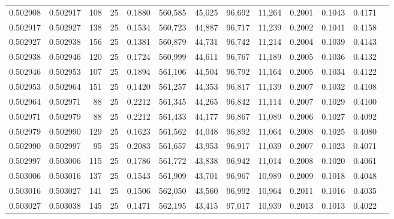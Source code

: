 \begin{tabular}{rrrrrrrrrrrrr}
0.502908 & 0.502917 & 108 &  25 &                                     0.1880 & 560,585 &  45,025 &  96,692 &  11,264 & 0.2001 & 0.1043 & 0.4171 \\
0.502917 & 0.502927 & 138 &  25 &                                     0.1534 & 560,723 &  44,887 &  96,717 &  11,239 & 0.2002 & 0.1041 & 0.4158 \\
0.502927 & 0.502938 & 156 &  25 &                                     0.1381 & 560,879 &  44,731 &  96,742 &  11,214 & 0.2004 & 0.1039 & 0.4143 \\
0.502938 & 0.502946 & 120 &  25 &                                     0.1724 & 560,999 &  44,611 &  96,767 &  11,189 & 0.2005 & 0.1036 & 0.4132 \\
0.502946 & 0.502953 & 107 &  25 &                                     0.1894 & 561,106 &  44,504 &  96,792 &  11,164 & 0.2005 & 0.1034 & 0.4122 \\
0.502953 & 0.502964 & 151 &  25 &                                     0.1420 & 561,257 &  44,353 &  96,817 &  11,139 & 0.2007 & 0.1032 & 0.4108 \\
0.502964 & 0.502971 &  88 &  25 &                                     0.2212 & 561,345 &  44,265 &  96,842 &  11,114 & 0.2007 & 0.1029 & 0.4100 \\
0.502971 & 0.502979 &  88 &  25 &                                     0.2212 & 561,433 &  44,177 &  96,867 &  11,089 & 0.2006 & 0.1027 & 0.4092 \\
0.502979 & 0.502990 & 129 &  25 &                                     0.1623 & 561,562 &  44,048 &  96,892 &  11,064 & 0.2008 & 0.1025 & 0.4080 \\
0.502990 & 0.502997 &  95 &  25 &                                     0.2083 & 561,657 &  43,953 &  96,917 &  11,039 & 0.2007 & 0.1023 & 0.4071 \\
0.502997 & 0.503006 & 115 &  25 &                                     0.1786 & 561,772 &  43,838 &  96,942 &  11,014 & 0.2008 & 0.1020 & 0.4061 \\
0.503006 & 0.503016 & 137 &  25 &                                     0.1543 & 561,909 &  43,701 &  96,967 &  10,989 & 0.2009 & 0.1018 & 0.4048 \\
0.503016 & 0.503027 & 141 &  25 &                                     0.1506 & 562,050 &  43,560 &  96,992 &  10,964 & 0.2011 & 0.1016 & 0.4035 \\
0.503027 & 0.503038 & 145 &  25 &                                     0.1471 & 562,195 &  43,415 &  97,017 &  10,939 & 0.2013 & 0.1013 & 0.4022 \\

\end{tabular}
